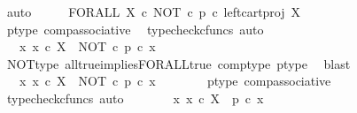 \begin{isabellebody}
\ auto\isanewline
\ \ \isamarkupfalse%
\ \isamarkupfalse%
\ {\isachardoublequoteopen}FORALL\ X\ {\isasymcirc}\isactrlsub c\ {\isacharparenleft}{\kern0pt}{\isacharparenleft}{\kern0pt}NOT\ {\isasymcirc}\isactrlsub c\ p{\isacharparenright}{\kern0pt}\ {\isasymcirc}\isactrlsub c\ left{\isacharunderscore}{\kern0pt}cart{\isacharunderscore}{\kern0pt}proj\ X\ {\isasymone}{\isacharparenright}{\kern0pt}\isactrlsup {\isasymsharp}\ {\isasymnoteq}\ {\isasymt}{\isachardoublequoteclose}\isanewline
\ \ \ \ \isamarkupfalse%
\ p{\isacharunderscore}{\kern0pt}type\ comp{\isacharunderscore}{\kern0pt}associative{}\ \isamarkupfalse%
\ {\isacharparenleft}{\kern0pt}typecheck{\isacharunderscore}{\kern0pt}cfuncs{\isacharcomma}{\kern0pt}\ auto{\isacharparenright}{\kern0pt}\isanewline
\ \ \isamarkupfalse%
\ \isamarkupfalse%
\ {\isachardoublequoteopen}{\isasymnot}\ {\isacharparenleft}{\kern0pt}{\isasymforall}\ x{\isachardot}{\kern0pt}\ x\ {\isasymin}\isactrlsub c\ X\ {\isasymlongrightarrow}\ {\isacharparenleft}{\kern0pt}NOT\ {\isasymcirc}\isactrlsub c\ p{\isacharparenright}{\kern0pt}\ {\isasymcirc}\isactrlsub c\ x\ {\isacharequal}{\kern0pt}\ {\isasymt}{\isacharparenright}{\kern0pt}{\isachardoublequoteclose}\isanewline
\ \ \ \ \isamarkupfalse%
\ NOT{\isacharunderscore}{\kern0pt}type\ all{\isacharunderscore}{\kern0pt}true{\isacharunderscore}{\kern0pt}implies{\isacharunderscore}{\kern0pt}FORALL{\isacharunderscore}{\kern0pt}true\ comp{\isacharunderscore}{\kern0pt}type\ p{\isacharunderscore}{\kern0pt}type\ \isamarkupfalse%
\ blast\isanewline
\ \ \isamarkupfalse%
\ \isamarkupfalse%
\ {\isachardoublequoteopen}{\isasymnot}\ {\isacharparenleft}{\kern0pt}{\isasymforall}\ x{\isachardot}{\kern0pt}\ x\ {\isasymin}\isactrlsub c\ X\ {\isasymlongrightarrow}\ NOT\ {\isasymcirc}\isactrlsub c\ {\isacharparenleft}{\kern0pt}p\ {\isasymcirc}\isactrlsub c\ x{\isacharparenright}{\kern0pt}\ {\isacharequal}{\kern0pt}\ {\isasymt}{\isacharparenright}{\kern0pt}{\isachardoublequoteclose}\isanewline
\ \ \ \ \isamarkupfalse%
\ p{\isacharunderscore}{\kern0pt}type\ comp{\isacharunderscore}{\kern0pt}associative{}\ \isamarkupfalse%
\ {\isacharparenleft}{\kern0pt}typecheck{\isacharunderscore}{\kern0pt}cfuncs{\isacharcomma}{\kern0pt}\ auto{\isacharparenright}{\kern0pt}\isanewline
\ \ \isamarkupfalse%
\ \isamarkupfalse%
\ {\isachardoublequoteopen}{\isasymnot}\ {\isacharparenleft}{\kern0pt}{\isasymforall}\ x{\isachardot}{\kern0pt}\ x\ {\isasymin}\isactrlsub c\ X\ {\isasymlongrightarrow}\ p\ {\isasymcirc}\isactrlsub c\ x\ {\isasymnoteq}\ {\isasymt}{\isacharparenright}{\kern0pt}{\isachardoublequoteclose}\isanewline

\end{isabellebody}

